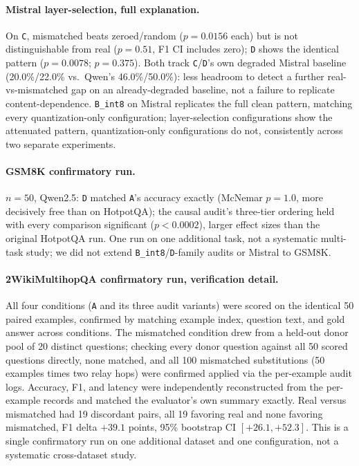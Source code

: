 \documentclass[11pt]{article}
\begin{document}
\paragraph{Mistral layer-selection, full explanation.} On \texttt{C},
mismatched beats zeroed/random ($p=0.0156$ each) but is not
distinguishable from real ($p=0.51$, F1 CI includes zero); \texttt{D}
shows the identical pattern ($p=0.0078$; $p=0.375$). Both track
\texttt{C}/\texttt{D}'s own degraded Mistral baseline (20.0\%/22.0\%
vs.\ Qwen's 46.0\%/50.0\%): less headroom to detect a further
real-vs-mismatched gap on an already-degraded baseline, not a failure
to replicate content-dependence. \texttt{B\_int8} on Mistral replicates
the full clean pattern, matching every quantization-only configuration;
layer-selection configurations show the attenuated pattern,
quantization-only configurations do not, consistently across two
separate experiments.

\paragraph{GSM8K confirmatory run.} $n=50$, Qwen2.5: \texttt{D} matched
\texttt{A}'s accuracy exactly (McNemar $p=1.0$, more decisively free
than on HotpotQA); the causal audit's three-tier ordering held with
every comparison significant ($p<0.0002$), larger effect sizes than the
original HotpotQA run. One run on one additional task, not a systematic
multi-task study; we did not extend \texttt{B\_int8}/\texttt{D}-family
audits or Mistral to GSM8K.

\paragraph{2WikiMultihopQA confirmatory run, verification detail.}
\label{app:2wiki}
All four conditions (\texttt{A} and its three audit variants) were
scored on the identical 50 paired examples, confirmed by matching
example index, question text, and gold answer across conditions. The
mismatched condition drew from a held-out donor pool of 20 distinct
questions; checking every donor question against all 50 scored
questions directly, none matched, and all 100 mismatched substitutions
(50 examples times two relay hops) were confirmed applied via the
per-example audit logs. Accuracy, F1, and latency were independently
reconstructed from the per-example records and matched the evaluator's
own summary exactly. Real versus mismatched had 19 discordant pairs,
all 19 favoring real and none favoring mismatched, F1 delta $+39.1$
points, 95\% bootstrap CI $[+26.1, +52.3]$. This is a single
confirmatory run on one additional dataset and one configuration, not a
systematic cross-dataset study.
\end{document}
